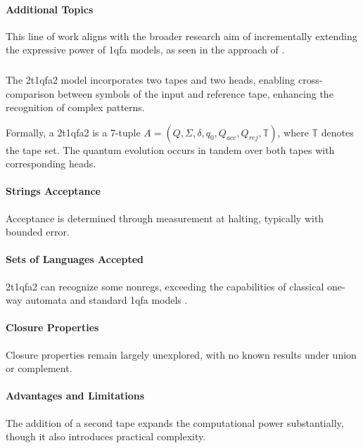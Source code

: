 \paragraph{Additional Topics}
This line of work aligns with the broader research aim of incrementally extending the expressive power of \gls{1qfa} models, as seen in the approach of \cite{ciamarra2001quantum}.

\subsubsection{}
The \gls{2t1qfa2} model incorporates two tapes and two heads, enabling cross-comparison between symbols of the input and reference tape, enhancing the recognition of complex patterns.

\begin{definition}
Formally, a \gls{2t1qfa2} is a 7-tuple \( A = (Q, \Sigma, \delta, q_0, Q_{acc}, Q_{rej}, \mathbb{T}) \), where \( \mathbb{T} \) denotes the tape set. The quantum evolution occurs in tandem over both tapes with corresponding heads.
\end{definition}

\paragraph{Strings Acceptance}
Acceptance is determined through measurement at halting, typically with bounded error.

\paragraph{Sets of Languages Accepted}
\gls{2t1qfa2} can recognize some non\glspl{reg}, exceeding the capabilities of classical one-way automata and standard \gls{1qfa} models \cite{ganguly20162}.

\paragraph{Closure Properties}
Closure properties remain largely unexplored, with no known results under union or complement.

\paragraph{Advantages and Limitations}
The addition of a second tape expands the computational power substantially, though it also introduces practical complexity.

